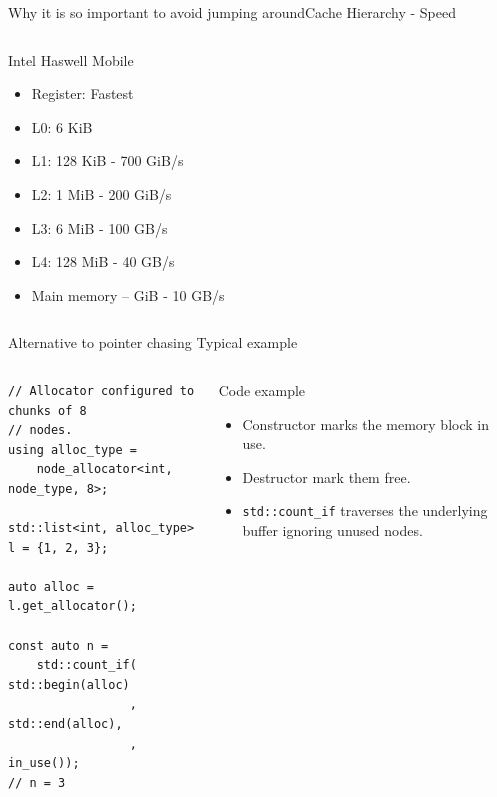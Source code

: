 \documentclass[10pt,aspectratio=169]{beamer}
\begin{document}
\begin{frame}{Why it is so important to avoid jumping around}{Cache Hierarchy - Speed}
\begin{columns}
        \begin{column}{0.3\textwidth}
          \begin{block} {Intel Haswell Mobile}
            \begin{itemize}
                \item Register: Fastest
                \item L0: 6 KiB
                \item L1: 128 KiB - 700 GiB/s
                \item L2: 1 MiB - 200 GiB/s
                \item L3: 6 MiB - 100 GB/s
                \item L4: 128 MiB - 40 GB/s
                \item Main memory – GiB - 10 GB/s
            \end{itemize}
          \end{block}
        \end{column}

    \end{columns}
\end{frame}

\begin{frame}[fragile]
{Alternative to pointer chasing}
{Typical example}
\begin{columns}
\begin{column}{0.47\textwidth}
\begin{lstlisting}
// Allocator configured to chunks of 8
// nodes.
using alloc_type =
    node_allocator<int, node_type, 8>;

std::list<int, alloc_type> l = {1, 2, 3};

auto alloc = l.get_allocator();

const auto n =
    std::count_if( std::begin(alloc)
                 , std::end(alloc),
                 , in_use());
// n = 3
\end{lstlisting}

\end{column}
\begin{column}{0.47\textwidth}
\begin{block} {Code example}
\begin{itemize}
\item Constructor marks the memory block in use.
\item Destructor mark them free.
\item \texttt{std::count\_if} traverses the underlying buffer
ignoring unused nodes.
\end{itemize}
\end{block}
\end{column}
\end{columns}
\end{frame}
\end{document}
